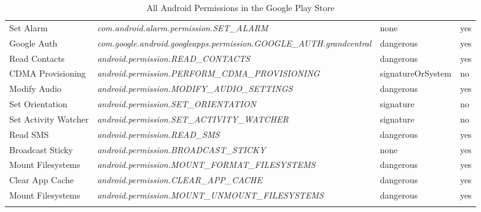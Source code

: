 \begin{small}
\begin{longtable}{p{3cm}|p{8cm}|p{2.5cm}|p{1.5cm}}
Set Alarm & \textit{com.android.alarm.permission.\-SET\_ALARM} & none & yes \\
Google Auth & \textit{com.google.android.googleapps.permission.\-GOOGLE\_AUTH.grandcentral} & dangerous & yes \\
Read Contacts & \textit{android.permission.\-READ\_CONTACTS} & dangerous & yes \\
CDMA Provisioning & \textit{android.permission.\-PERFORM\_CDMA\_PROVISIONING} & signatureOrSystem & no \\
Modify Audio & \textit{android.permission.\-MODIFY\_AUDIO\_SETTINGS} & dangerous & yes \\
Set Orientation & \textit{android.permission.\-SET\_ORIENTATION} & signature & no \\
Set Activity Watcher & \textit{android.permission.\-SET\_ACTIVITY\_WATCHER} & signature & no \\
Read SMS & \textit{android.permission.\-READ\_SMS} & dangerous & yes \\
Broadcast Sticky & \textit{android.permission.\-BROADCAST\_STICKY} & none & yes \\
Mount Filesystems & \textit{android.permission.\-MOUNT\_FORMAT\_FILESYSTEMS} & dangerous & yes \\
Clear App Cache & \textit{android.permission.\-CLEAR\_APP\_CACHE} & dangerous & yes \\
Mount Filesystems & \textit{android.permission.\-MOUNT\_UNMOUNT\_FILESYSTEMS} & dangerous & yes \\





\caption{All Android Permissions in the Google Play Store}
\label{tab:allperms}
\end{longtable}
\end{small}

